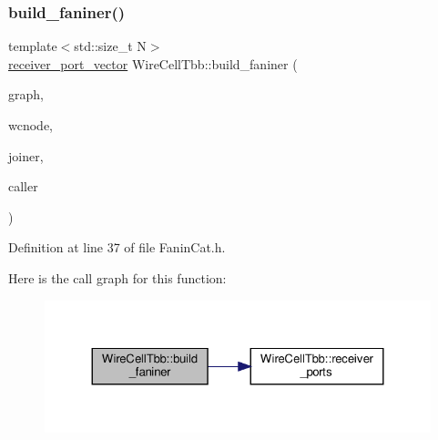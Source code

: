 \subsubsection{\texorpdfstring{build\+\_\+faniner()}{build\_faniner()}}
{\footnotesize\ttfamily template$<$std\+::size\+\_\+t N$>$ \\
\hyperlink{namespace_wire_cell_tbb_a87f42fe8a3ccc3bf9d315cb2d252c7af}{receiver\+\_\+port\+\_\+vector} Wire\+Cell\+Tbb\+::build\+\_\+faniner (\begin{DoxyParamCaption}\item[{tbb\+::flow\+::graph \&}]{graph,  }\item[{\hyperlink{class_wire_cell_1_1_interface_a09c548fb8266cfa39afb2e74a4615c37}{Wire\+Cell\+::\+I\+Node\+::pointer}}]{wcnode,  }\item[{tbb\+::flow\+::graph\+\_\+node $\ast$\&}]{joiner,  }\item[{tbb\+::flow\+::graph\+\_\+node $\ast$\&}]{caller }\end{DoxyParamCaption})}



Definition at line 37 of file Fanin\+Cat.\+h.

Here is the call graph for this function\+:
\nopagebreak
\begin{figure}[H]
\begin{center}
\leavevmode
\includegraphics[width=324pt]{namespace_wire_cell_tbb_a9288a235bfd20c9cecbac374684b9fc3_cgraph}
\end{center}
\end{figure}
\mbox{\label{namespace_wire_cell_tbb_ab99dbcf9cc9065475d9b911ace3dd2b2}} 
